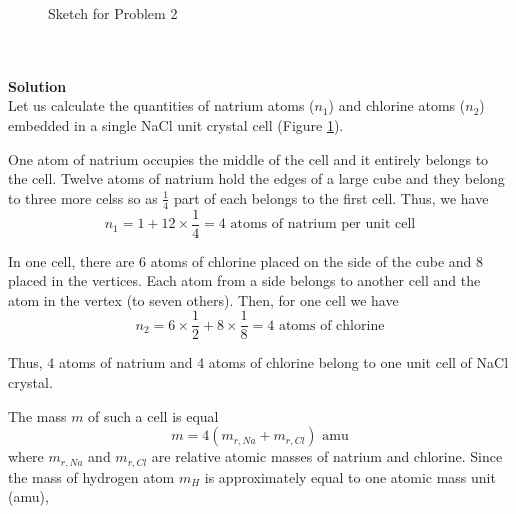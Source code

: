 \documentclass[12pt,a4paper]{book}
\begin{document}
\begin{figure}
		\caption{Sketch for Problem 2}
		\label{sketch_4_2_1}
	\end{figure}\\ \\
	\textbf{Solution}\\
	Let us calculate the quantities of natrium atoms ($n_1$) and chlorine atoms ($n_2$) embedded in a single NaCl unit crystal cell (Figure \ref{sketch_4_2_1}).\par
	One atom of natrium occupies the middle of the cell and it entirely belongs to the cell. Twelve atoms of natrium hold the edges of a large cube and they belong to three more celss so as $\frac{1}{4}$ part of each belongs to the f\mbox{}irst cell. Thus, we have
	\begin{equation*}
		n_1=1+12\times\frac{1}{4}=4\text{ atoms of natrium per unit cell}
	\end{equation*}\par
	In one cell, there are 6 atoms of chlorine placed on the side of the cube and 8 placed in the vertices. Each atom from a side belongs to another cell and the atom in the vertex (to seven others). Then, for one cell we have
	\begin{equation*}
		n_2=6\times\frac{1}{2}+8\times\frac{1}{8}=4\text{ atoms of chlorine}
	\end{equation*}\par
	Thus, 4 atoms of natrium and 4 atoms of chlorine belong to one unit cell of NaCl crystal.\par
	The mass $m$ of such a cell is equal
	\begin{equation*}
		m=4(m_{r,Na}+m_{r,Cl})\text{ amu}
	\end{equation*}
	where $m_{r,Na}$ and $m_{r,Cl}$ are relative atomic masses of natrium and chlorine. Since the mass of hydrogen atom $m_H$ is approximately equal to one atomic mass unit (amu),
\end{document}
